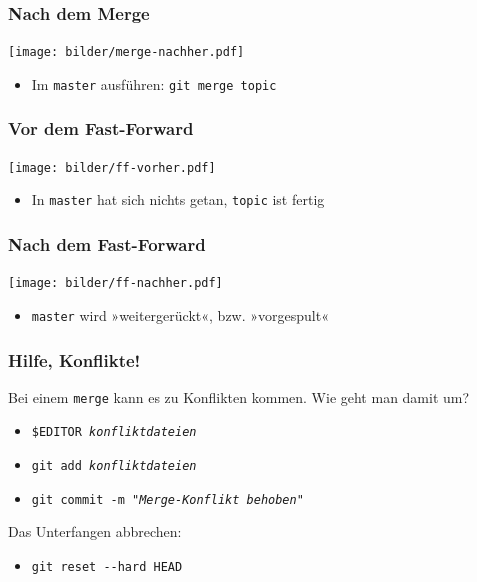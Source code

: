 \documentclass{beamer}
\begin{document}
\begin{frame}
 \frametitle{Nach dem Merge}



\begin{center}
\texttt{[image: bilder/merge-nachher.pdf]}
\end{center}

\begin{itemize}
	\item Im \texttt{master} ausführen: \texttt{git merge topic}
\end{itemize}


 \end{frame}
\begin{frame}
 \frametitle{Vor dem Fast-Forward}



\begin{center}
\texttt{[image: bilder/ff-vorher.pdf]}
\end{center}

\begin{itemize}
	\item In \texttt{master} hat sich nichts getan, \texttt{topic} ist fertig
\end{itemize}


 \end{frame}
\begin{frame}
 \frametitle{Nach dem Fast-Forward}



\begin{center}
\texttt{[image: bilder/ff-nachher.pdf]}
\end{center}

\begin{itemize}
	\item \texttt{master} wird »weitergerückt«, bzw. »vorgespult«
\end{itemize}


 \end{frame}
\begin{frame}
 \frametitle{Hilfe, Konflikte!}



Bei einem \texttt{merge} kann es zu Konflikten kommen. Wie geht man damit um?
\begin{itemize}
	\item \texttt{\$EDITOR \emph{konfliktdateien}}
	\item \texttt{git add \emph{konfliktdateien}}
	\item \texttt{git commit -m "\emph{Merge-Konflikt behoben}"}
\end{itemize}


\vspace{.5em}

Das Unterfangen abbrechen:
\begin{itemize}
	\item \texttt{git reset -{}-hard HEAD}
\end{itemize}


 \end{frame}
\end{document}

